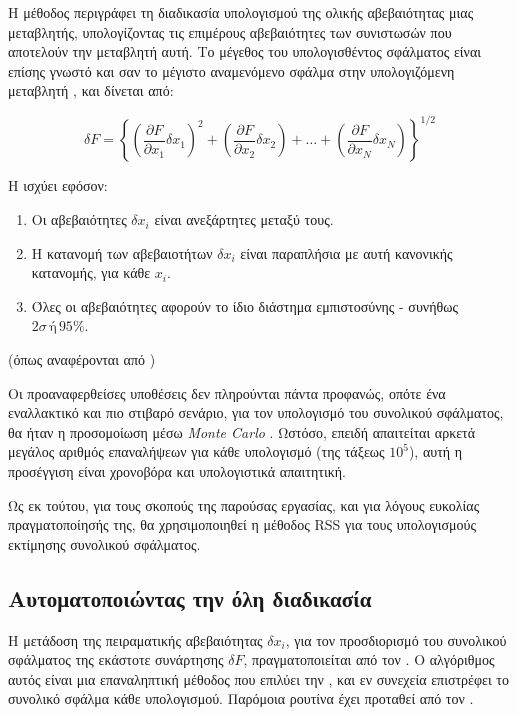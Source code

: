 Η μέθοδος περιγράφει τη διαδικασία υπολογισμού της ολικής αβεβαιότητας μιας μεταβλητής, υπολογίζοντας τις επιμέρους αβεβαιότητες των συνιστωσών που αποτελούν την μεταβλητή αυτή. Το μέγεθος του υπολογισθέντος σφάλματος είναι επίσης γνωστό και σαν το μέγιστο αναμενόμενο σφάλμα στην υπολογιζόμενη μεταβλητή \cite{1988_Moffat}, και δίνεται από:

\begin{equation}\label{eq:rss}
\delta F = \left\{\left(\frac{\partial F}{\partial x_1} \delta x_1\right) ^ 2 + \left(\frac{\partial F}{\partial x_2} \delta x_2\right) + \dots + \left(\frac{\partial F}{\partial x_N} \delta x_N\right)\right\} ^ {1/2}
\end{equation}

\noindent Η  ισχύει εφόσον: 

\begin{enumerate}
\item Οι αβεβαιότητες $\delta x_i$ είναι ανεξάρτητες μεταξύ τους.
\item Η κατανομή των αβεβαιοτήτων $\delta x_i$ είναι παραπλήσια με αυτή κανονικής κατανομής, για κάθε $x_i$.
\item Όλες οι αβεβαιότητες αφορούν το ίδιο διάστημα εμπιστοσύνης - συνήθως $2\sigma \, \text{ή} \, 95\%$.
\end{enumerate}

\begin{flushright}
(όπως αναφέρονται από \citeauthor{1953_Kline} \cite{1953_Kline})
\end{flushright}

Οι προαναφερθείσες υποθέσεις δεν πληρούνται πάντα προφανώς, οπότε ένα εναλλακτικό και πιο στιβαρό σενάριο, για τον υπολογισμό του συνολικού σφάλματος, θα ήταν η προσομοίωση μέσω \textit{Monte Carlo} \cite{2018_HughW.Coleman_BOOK}. Ωστόσο, επειδή απαιτείται αρκετά μεγάλος αριθμός επαναλήψεων για κάθε υπολογισμό (της τάξεως $10^5$), αυτή η προσέγγιση είναι χρονοβόρα και υπολογιστικά απαιτητική.

Ως εκ τούτου, για τους σκοπούς της παρούσας εργασίας, και για λόγους ευκολίας πραγματοποίησής της, θα χρησιμοποιηθεί η μέθοδος RSS για τους υπολογισμούς εκτίμησης συνολικού σφάλματος. 

\subsection{Αυτοματοποιώντας την όλη διαδικασία}\label{uncertpre}

\noindent Η μετάδοση της πειραματικής αβεβαιότητας $\delta x_i$, για τον προσδιορισμό του συνολικού σφάλματος της εκάστοτε συνάρτησης $\delta F$, πραγματοποιείται από τον . Ο αλγόριθμος αυτός είναι μια επαναληπτική μέθοδος που επιλύει την , και εν συνεχεία επιστρέφει το συνολικό σφάλμα κάθε υπολογισμού. Παρόμοια ρουτίνα έχει προταθεί από τον \citeauthor{1985_Moffat} \cite{1985_Moffat}.

